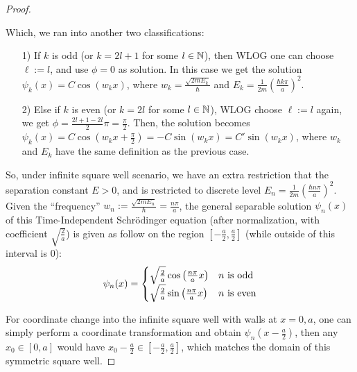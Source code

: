 \documentclass{article}
\begin{document}
\begin{proof}
\begin{itemize}
        Which, we ran into another two classifications:
        \begin{itemize}
            \item[1)] If $k$ is odd (or $k=2l+1$ for some $l\in\mathbb{N}$), then WLOG one can choose $\ell:=l$, and use $\phi=0$ as solution. In this case we get the solution $\psi_k(x)=C\cos(w_kx)$, where $w_k=\frac{\sqrt{2mE_k}}{\hbar}$ and $E_k=\frac{1}{2m}\left(\frac{\hbar k\pi}{a}\right)^2$.
            \item[2)] Else if $k$ is even (or $k=2l$ for some $l\in\mathbb{N}$), WLOG choose $\ell:=l$ again, we get $\phi=\frac{2l+1-2l}{2}\pi=\frac{\pi}{2}$. Then, the solution becomes $\psi_k(x)=C\cos(w_kx+\frac{\pi}{2})=-C\sin(w_kx) = C'\sin(w_kx)$, where $w_k$ and $E_k$ have the same definition as the previous case.
        \end{itemize}
    \end{itemize}
    So, under infinite square well scenario, we have an extra restriction that the separation constant $E>0$, and is restricted to discrete level $E_n=\frac{1}{2m}\left(\frac{\hbar n\pi}{a}\right)^2$. Given the ``frequency'' $w_n:=\frac{\sqrt{2mE_n}}{\hbar}=\frac{n\pi}{a}$, the general separable solution $\psi_n(x)$ of this Time-Independent Schrödinger equation (after normalization, with coefficient $\sqrt{\frac{2}{a}}$) is given as follow on the region $[-\frac{a}{2},\frac{a}{2}]$ (while outside of this interval is $0$):
    \begin{align}
        \psi_n(x)=\begin{cases}
            \sqrt{\frac{2}{a}}\cos\left(\frac{n\pi}{a}x\right) & n \textmd{ is odd}\\
            \sqrt{\frac{2}{a}}\sin\left(\frac{n\pi}{a}x\right) & n \textmd{ is even}
        \end{cases}
    \end{align}


    \hfil

    For coordinate change into the infinite square well with walls at $x=0,a$, one can simply perform a coordinate transformation and obtain $\psi_n(x-\frac{a}{2})$, then any $x_0\in [0,a]$ would have $x_0-\frac{a}{2}\in [-\frac{a}{2},\frac{a}{2}]$, which matches the domain of this symmetric square well.
\end{proof}

\newpage
\end{document}

